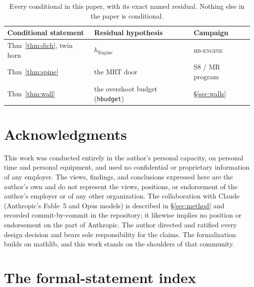 \documentclass{CUP-JNL-FMP}
\theoremstyle{remark}
\begin{document}
\begin{table}[h]
\centering\small
\begin{tabular}{lll}
\toprule
Conditional statement & Residual hypothesis & Campaign \\
\midrule
Thm~\ref{thm:dich}, twin horn & $h_{\mathrm{Engine}}$ & \textsc{hb-engine} \\
Thm~\ref{thm:spine} & the MRT door & S8 / MR program \\
Thm~\ref{thm:wall} & the overshoot budget (\texttt{hbudget}) & \S\ref{sec:walls} \\
\bottomrule
\end{tabular}
\caption{Every conditional in this paper, with its exact named residual.
Nothing else in the paper is conditional.}
\label{tab:conditional}
\end{table}

\section*{Acknowledgments}
This work was conducted entirely in the author's personal capacity, on
personal time and personal equipment, and used no confidential or
proprietary information of any employer. The views, findings, and
conclusions expressed here are the author's own and do not represent
the views, positions, or endorsement of the author's employer or of any
other organization. The collaboration with Claude (Anthropic's Fable~5
and Opus models) is described in \S\ref{sec:method} and recorded
commit-by-commit in the repository; it likewise implies no position or
endorsement on the part of Anthropic. The author directed and ratified
every design decision and bears sole responsibility for the claims. The
formalization builds on \textsf{mathlib}, and this work stands on the
shoulders of that community.

\appendix
\section{The formal-statement index}\label{app:index}
\end{document}

